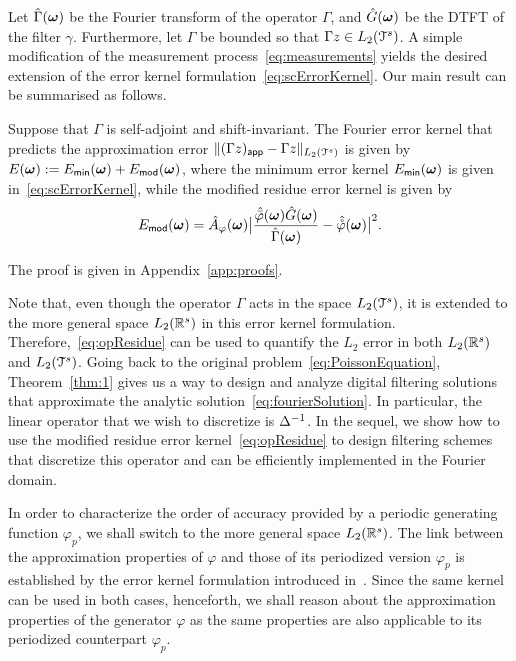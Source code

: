 Let $\hat{\Gamma}(\boldsymbol{\omega})$ be the Fourier transform of the operator
$\Gamma$, and $\hat{G}(\boldsymbol{\omega})$ be the DTFT of the filter $\gamma$.
Furthermore, let $\Gamma$ be bounded so that $\Gamma z \in L_2(\mathcal{T}^s)$.
A simple modification of the measurement process~\eqref{eq:measurements} yields
the desired extension of the error kernel formulation~\eqref{eq:scErrorKernel}.
Our main result can be summarised as follows.
\begin{thm}
  Suppose that $\Gamma$ is self-adjoint and shift-invariant. The Fourier
  error kernel that predicts the approximation error
  $\lVert (\Gamma z)_{\mathsf{app}} - \Gamma z \rVert_{L_2(\mathcal{T}^s)}$ is given by $E(\boldsymbol{\omega}) :=
  E_{\mathsf{min}}(\boldsymbol{\omega}) + E_{\mathsf{mod}}(\boldsymbol{\omega})$,
  where the minimum error kernel $E_{\mathsf{min}}(\boldsymbol{\omega})$ is
  given in~\eqref{eq:scErrorKernel}, while the modified residue
  error kernel is given by
  \begin{equation}
    E_{\mathsf{mod}}(\vect{\omega}) = 
    \ft{A}_{\varphi}(\vect{\omega})
    \abs{
      \frac{\ft{\analysis{\varphi}}(\vect{\omega}) \ft{G}(\vect{\omega})}
      {\ft{\Gamma}(\vect{\omega})}
      - 
      \ft{\dual{\varphi}}(\vect{\omega})}^2.
    \label{eq:opResidue}
  \end{equation}
\label{thm:1}
\end{thm}
The proof is given in Appendix~\ref{app:proofs}.

Note that, even though the operator $\Gamma$ acts in the space $L_2(\mathcal{T}^s)$,
it is extended to the more general space $L_2(\mathbb{R}^s)$ in this error kernel
formulation.
Therefore,~\eqref{eq:opResidue} can be used to quantify the $L_2$ error in both
$L_2(\mathbb{R}^s)$ and $L_2(\mathcal{T}^s)$. Going back to the original
problem~\eqref{eq:PoissonEquation}, Theorem~\ref{thm:1} gives us a way to design
and analyze digital filtering solutions that approximate the analytic
solution~\eqref{eq:fourierSolution}. In particular, the linear operator that we
wish to discretize is $\mathop{\Delta^{-1}}$. In the sequel, we show how to use the
modified residue error kernel~\eqref{eq:opResidue} to design filtering schemes
that discretize this operator and can be efficiently implemented in the
Fourier domain.

In order to characterize the order of accuracy provided by a periodic
generating function $\varphi_p$, we shall switch to the more general
space $L_2(\mathbb{R}^s)$.  The link between the approximation properties
of $\varphi$ and those of its periodized version $\varphi_p$ is
established by the error kernel formulation introduced
in~. Since the same kernel can be used in
both cases, henceforth, we shall reason about the approximation
properties of the generator $\varphi$ as the same properties are also
applicable to its periodized counterpart $\varphi_p$.

